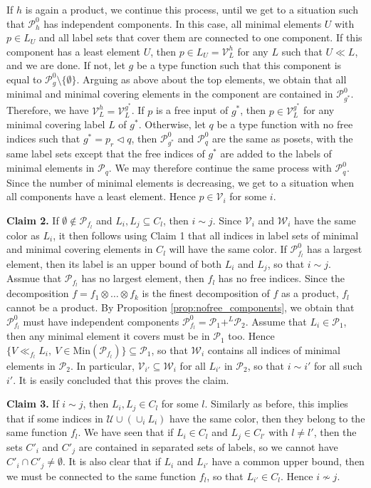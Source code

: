 \documentclass[12pt]{article}
\theoremstyle{definition}
\theoremstyle{remark}
\def\indep{+^L}
\def\cover{\ll}
\def\Pe{\mathcal P}
\def\vtl{\vartriangleleft}
\begin{document}
If $h$ is again a product, we
continue this process, until we get to a situation such that $\Pe_h^0$ has independent
components. In this case,  all minimal elements $U$ with  $p\in L_U$ and all label sets
that cover them  are connected to  one component. If this component has a least element
$U$, then $p\in L_U=\mathcal V^h_L$ for any $L$ such that $U\cover L$, and we are done.    
If not, let $g$ be a type function such that this
component is equal to $\Pe_g^0\setminus \{\emptyset\}$. Arguing as above about the top
elements, we obtain that all minimal and minimal covering elements in the component are
contained in $\Pe_{g^*}^0$. Therefore, we have $\mathcal V^h_L=\mathcal V^{g^*}_L$. 
If $p$ is a free input of $g^*$, then $p\in \mathcal
V^{g^*}_L$ for any minimal covering label $L$ of $g^*$. Otherwise, let $q$ be a type function with
no free indices such that $g^*=p_r\vtl q$, then $\Pe_{g^*}^0$ and  $\Pe_q^0$ are the
same as posets, with the same label sets except that the free indices of $g^*$ are added
to the labels of minimal elements in $\Pe_q$. We may therefore continue the same process
with $\Pe_q^0$. Since the number of minimal elements is decreasing, we get to a situation 
when all components have a least element. Hence $p\in \mathcal V_i$ for some $i$. 

\medskip
\noindent
\textbf{Claim 2.} If $\emptyset \notin \Pe_{f_l}$ and  $L_i,L_j\subseteq C_l$,  then $i\sim j$. 
Since $\mathcal V_i$ and $\mathcal W_i$ have the same color as $L_i$, it then
follows using Claim 1 that all indices in label sets of minimal and minimal covering elements in $C_l$
will have the same color. If  $\Pe_{f_l}^0$ has a largest element, then its label
is an upper bound of both  $L_i$  and $L_j$, so that $i\sim j$. Assmue that $\Pe_{f_l}$
has no largest element, then $f_l$ has no free indices. Since the decomposition
$f=f_1\otimes \dots\otimes f_k$ is the  finest decomposition of $f$ as a product, $f_l$
cannot be a product. By Proposition \ref{prop:nofree_components}, we obtain that $\Pe_{f_l}^0$ must have
independent components $\Pe_{f_l}^0=\Pe_1\indep \Pe_2$. Assume that  $L_i\in \Pe_1$, then any
minimal element it covers must be in $\Pe_1$ too. Hence $\{V\cover_{f_l} L_i,\ V\in
\mathrm{Min}(\Pe_{f_l})\}\subseteq \Pe_1$, so that $\mathcal W_i$ contains all indices of
minimal elements in $\Pe_2$. In particular, $\mathcal V_{i'}\subseteq \mathcal W_i$ for
all $L_{i'}$ in $\Pe_2$, so that $i\sim i'$ for all such $i'$. It is easily concluded that
this proves the claim. 

\medskip
\noindent
\textbf{Claim 3.} If $i\sim j$, then $L_i,L_j\in C_l$ for some $l$. Similarly as before, this
implies that if some  indices in $\mathcal U \cup (\cup_iL_i)$ have the same color, then
they belong to the same function $f_l$. We have seen that if $L_i\in C_l$ and $L_j\in C_{l'}$
with $l\ne l'$, then the sets $C'_i$ and $C'_j$ are contained in separated  sets of labels, so we
cannot have $C'_i\cap C'_j\ne \emptyset$.
It is also clear that if $L_i$ and $L_{i'}$ have a common upper bound, then we must be
connected to the same function $f_l$, so that $L_{i'}\in C_l$.  Hence $i\not\sim j$. 
\end{document}

